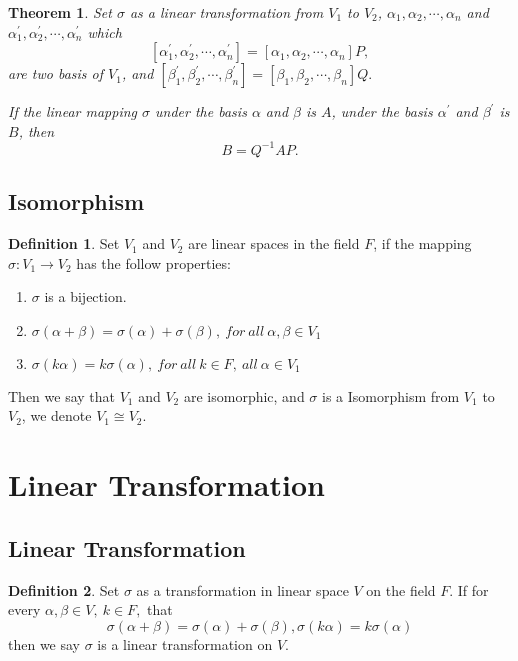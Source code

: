 \documentclass{article}
\newtheorem{theorem}{Theorem}[section]
\theoremstyle{definition}
\newtheorem{defi}{Definition}[section]
\begin{document}
\begin{theorem}
    Set $\sigma$ as a linear transformation from $V_{1}$ to 
    $V_{2}$, $\alpha_{1},\alpha_{2},\cdots,\alpha_{n}$ and 
    $\alpha_{1}^{'},\alpha_{2}^{'},\cdots,\alpha_{n}^{'}$ 
    which 
    $$[\alpha_{1}^{'},\alpha_{2}^{'},\cdots,\alpha_{n}^{'}]=[\alpha_{1},\alpha_{2},\cdots,\alpha_{n}]P,$$
    are two basis of $V_{1}$, and $[\beta_{1}^{'},\beta_{2}^{'},\cdots,\beta_{n}^{'}]=
    [\beta_{1},\beta_{2},\cdots,\beta_{n}]Q.$

    If the linear mapping $\sigma$ under the basis $\alpha$ and $\beta$ is $A$, 
    under the basis $\alpha^{'}$ and $\beta^{'}$ is $B$, then 
    $$B=Q^{-1}AP.$$
\end{theorem}

\subsection{Isomorphism}
\begin{defi}
    Set $V_{1}$ and $V_{2}$ are linear spaces in the field $F$, if the 
    mapping $\sigma:V_{1}\rightarrow V_{2}$ has the follow properties:
    \begin{enumerate}
        \item $\sigma$ is a bijection.
        \item $\sigma (\alpha +\beta)=\sigma (\alpha)+\sigma(\beta),\ for\ all\ \alpha,\beta \in V_{1}$
        \item $\sigma(k\alpha)=k\sigma(\alpha),\ for\ all\ k\in F,\ all\ \alpha\in V_{1}$
    \end{enumerate}
    Then we say that $V_{1}$ and $V_{2}$ are isomorphic, and $\sigma$ is a 
    Isomorphism from $V_{1}$ to $V_{2}$, we denote $V_{1}\cong V_{2}.$
\end{defi}

\section{Linear Transformation}
\subsection{Linear Transformation}
\begin{defi}
    Set $\sigma$ as a transformation in linear space $V$ on the field $F$. 
    If for every $\alpha,\beta \in V,\ k \in F,$ that
    $$\sigma(\alpha+\beta)=\sigma(\alpha)+\sigma(\beta),\sigma(k\alpha)=k\sigma(\alpha)$$
    then we say $\sigma$ is a linear transformation on $V$. 
\end{defi}
\end{document}
